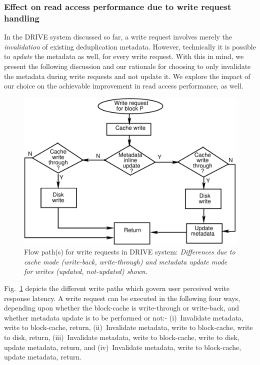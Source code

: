 \subsubsection{Effect on read access performance due to write request handling}
In the DRIVE system discussed so far, a write request involves merely
the \textit{invalidation} of existing deduplication metadata. 
However, technically
it is possible to \textit{update} the metadata as well, for every write
request. With this in mind, we present the following discussion and our
rationale for choosing to only invalidate the metadata during write requests
and not update it.
We explore the impact of our choice on the achievable improvement
in read access performance, as well.

\begin{figure}[t]
    \centering
    \includegraphics[scale=0.65]{confided-figures/main/dedup-working-writeflow.pdf}
    \caption{Flow path(s) for write requests in DRIVE system: \textit{Differences due to 
			cache mode (write-back, write-through) and 
			metadata update mode for writes (updated, 
			not-updated) shown.}}
    \label{fig:confided-writeflow}
\end{figure}

Fig.~\ref{fig:confided-writeflow} depicts the different
write paths which govern user perceived write response latency.
A write request can be executed in the following four ways, depending
upon whether the block-cache is write-through or write-back, and
whether metadata update is to be performed or not:-
(i)~Invalidate metadata, write to block-cache, return,
(ii)~Invalidate metadata, write to block-cache, write to disk, return,
(iii)~Invalidate metadata, write to block-cache, write to disk,
update metadata, return, and
(iv)~Invalidate metadata, write to block-cache, update metadata, return.

